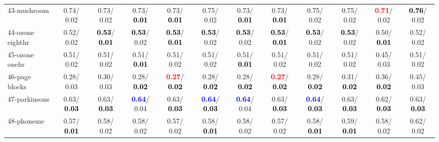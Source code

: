 \begin{table}[h]
\begin{center}
{\begin{tabular}{lc|c|c|c|c|c|c|c|c|c|c}
43-mushroom &   0.74/  0.02 &   0.73/  0.02 &   0.73/\textcolor{black}{\textbf{  0.01}} &   0.73/\textcolor{black}{\textbf{  0.01}} &   0.75/  0.02 &   0.73/\textcolor{black}{\textbf{  0.01}} &   0.73/\textcolor{black}{\textbf{  0.01}} &   0.75/  0.02 &   0.75/  0.02 & \textcolor{red}{\textbf{  0.71}}/  0.02 & \textcolor{black}{\textbf{  0.76}}/  0.02 \\
44-ozone eighthr &   0.52/  0.02 & \textcolor{black}{\textbf{  0.53}}/\textcolor{black}{\textbf{  0.01}} & \textcolor{black}{\textbf{  0.53}}/  0.02 & \textcolor{black}{\textbf{  0.53}}/\textcolor{black}{\textbf{  0.01}} & \textcolor{black}{\textbf{  0.53}}/  0.02 & \textcolor{black}{\textbf{  0.53}}/  0.02 & \textcolor{black}{\textbf{  0.53}}/\textcolor{black}{\textbf{  0.01}} & \textcolor{black}{\textbf{  0.53}}/  0.02 & \textcolor{black}{\textbf{  0.53}}/  0.02 &   0.50/\textcolor{black}{\textbf{  0.01}} &   0.52/  0.02 \\
45-ozone onehr &   0.51/  0.02 &   0.51/  0.02 &   0.51/\textcolor{black}{\textbf{  0.01}} &   0.51/  0.02 &   0.51/  0.02 &   0.51/\textcolor{black}{\textbf{  0.01}} &   0.51/  0.02 &   0.51/  0.02 &   0.51/  0.02 &   0.45/  0.03 &   0.51/  0.02 \\
46-page blocks &   0.28/  0.03 &   0.30/  0.03 &   0.28/\textcolor{black}{\textbf{  0.02}} & \textcolor{red}{\textbf{  0.27}}/\textcolor{black}{\textbf{  0.02}} &   0.28/\textcolor{black}{\textbf{  0.02}} &   0.28/\textcolor{black}{\textbf{  0.02}} & \textcolor{red}{\textbf{  0.27}}/\textcolor{black}{\textbf{  0.02}} &   0.28/\textcolor{black}{\textbf{  0.02}} &   0.31/\textcolor{black}{\textbf{  0.02}} &   0.36/\textcolor{black}{\textbf{  0.02}} &   0.45/  0.03 \\ \hline
47-parkinsons &   0.63/\textcolor{black}{\textbf{  0.03}} &   0.63/\textcolor{black}{\textbf{  0.03}} & \textcolor{blue}{\textbf{  0.64}}/  0.04 &   0.63/\textcolor{black}{\textbf{  0.03}} & \textcolor{blue}{\textbf{  0.64}}/\textcolor{black}{\textbf{  0.03}} & \textcolor{blue}{\textbf{  0.64}}/  0.04 &   0.63/\textcolor{black}{\textbf{  0.03}} & \textcolor{blue}{\textbf{  0.64}}/\textcolor{black}{\textbf{  0.03}} &   0.63/\textcolor{black}{\textbf{  0.03}} &   0.62/\textcolor{black}{\textbf{  0.03}} &   0.63/\textcolor{black}{\textbf{  0.03}} \\
48-phoneme &   0.57/\textcolor{black}{\textbf{  0.01}} &   0.58/  0.02 &   0.58/  0.02 &   0.57/  0.02 &   0.58/\textcolor{black}{\textbf{  0.01}} &   0.58/  0.02 &   0.57/  0.02 &   0.58/\textcolor{black}{\textbf{  0.01}} &   0.59/\textcolor{black}{\textbf{  0.01}} &   0.58/  0.02 &   0.62/  0.02 \\

\end{tabular}}
\end{center}
\end{table}
